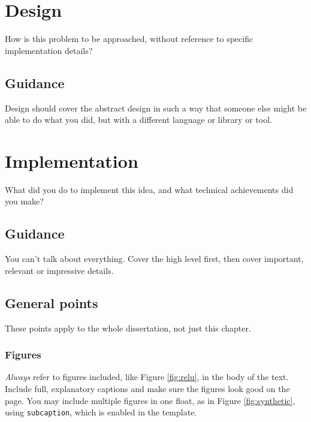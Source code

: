 \documentclass{l4proj}
\begin{document}
\chapter{Design}
How is this problem to be approached, without reference to specific implementation details? 
\section{Guidance}
Design should cover the abstract design in such a way that someone else might be able to do what you did, but with a different language or library or tool.

\chapter{Implementation}
What did you do to implement this idea, and what technical achievements did you make?
\section{Guidance}
You can't talk about everything. Cover the high level first, then cover important, relevant or impressive details.



\section{General points}

These points apply to the whole dissertation, not just this chapter.



\subsection{Figures}
\emph{Always} refer to figures included, like Figure \ref{fig:relu}, in the body of the text. Include full, explanatory captions and make sure the figures look good on the page.
You may include multiple figures in one float, as in Figure \ref{fig:synthetic}, using \texttt{subcaption}, which is enabled in the template.
\end{document}
